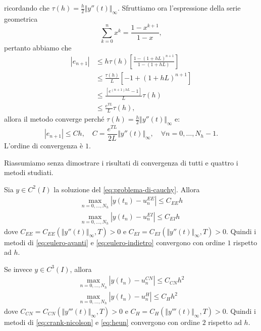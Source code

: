ricordando che $\tau (h) =\frac{h}{2}\Vert y''(t)\Vert _{\infty }$.
Sfruttiamo ora l'espressione della serie geometrica
\begin{equation*}
\sum\limits ^{n}_{k=0} x^{k} =\frac{1-x^{k+1}}{1-x},
\end{equation*}
pertanto abbiamo che
\begin{align*}
| e_{n+1}|  & \leqslant h\tau (h)\left[\frac{1-( 1+hL)^{n+1}}{1-( 1+hL)}\right]\\
 & \leqslant \frac{\tau (h)}{L}\left[ -1+( 1+hL)^{n+1}\right]\\
 & \leqslant \frac{\left[ e^{( n+1) hL} -1\right]}{L} \tau (h)\\
 & \leqslant \frac{e^{TL}}{L} \tau (h),
\end{align*}
allora il metodo converge perché $\tau (h) =\frac{h}{2}\Vert y''(t)\Vert _{\infty }$ e:
\begin{equation*}
| e_{n+1}| \leqslant Ch,\quad C=\frac{e^{TL}}{2L}\Vert y''(t)\Vert _{\infty } ,\quad \forall n=0,\dotsc ,N_{h} -1.
\end{equation*}
L'ordine di convergenza è $1$. \textqed

Riassumiamo senza dimostrare i risultati di convergenza di tutti e quattro i metodi studiati.
\begin{theorem}
Sia $y\in C^{2}(I)$ la soluzione del \eqref{eq:problema-di-cauchy}. Allora
\begin{gather*}
\max_{n=0,\dotsc ,N_{h}}\left| y( t_{n}) -u^{EE}_{n}\right| \leqslant C_{EE} h\\
\max_{n=0,\dotsc ,N_{h}}\left| y( t_{n}) -u^{EI}_{n}\right| \leqslant C_{EI} h
\end{gather*}
dove $C_{EE} =C_{EE}(\Vert y''(t)\Vert _{\infty } ,T)  >0$ e $C_{EI} =C_{EI}(\Vert y''(t)\Vert _{\infty } ,T)  >0$. Quindi i metodi di \eqref{eq:eulero-avanti} e \eqref{eq:eulero-indietro} convergono con ordine $1$ rispetto ad $h$.

Se invece $y\in C^{3}(I)$, allora
\begin{gather*}
\max_{n=0,\dotsc ,N_{h}}\left| y( t_{n}) -u^{CN}_{n}\right| \leqslant C_{CN} h^{2}\\
\max_{n=0,\dotsc ,N_{h}}\left| y( t_{n}) -u^{H}_{n}\right| \leqslant C_{H} h^{2}
\end{gather*}
dove $C_{CN} =C_{CN}(\Vert y'''(t)\Vert _{\infty } ,T)  >0$ e $C_{H} =C_{H}(\Vert y'''(t)\Vert _{\infty } ,T)  >0$. Quindi i metodi di \eqref{eq:crank-nicolson} e \eqref{eq:heun} convergono con ordine $2$ rispetto ad $h$.
\end{theorem}

